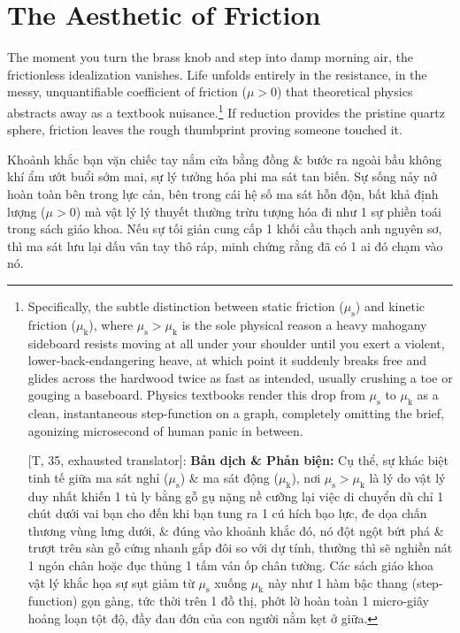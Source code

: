 \documentclass[11pt]{article}
\begin{document}
\section{The Aesthetic of Friction}
The moment you turn the brass knob and step into damp morning air, the frictionless idealization vanishes. Life unfolds entirely in the resistance, in the messy, unquantifiable coefficient of friction ($\mu > 0$) that theoretical physics abstracts away as a textbook nuisance.\footnote{Specifically, the subtle distinction between static friction ($\mu_{\mathrm{s}}$) and kinetic friction ($\mu_{\mathrm{k}}$), where $\mu_{\mathrm{s}} > \mu_{\mathrm{k}}$ is the sole physical reason a heavy mahogany sideboard resists moving at all under your shoulder until you exert a violent, lower-back-endangering heave, at which point it suddenly breaks free and glides across the hardwood twice as fast as intended, usually crushing a toe or gouging a baseboard. Physics textbooks render this drop from $\mu_{\mathrm{s}}$ to $\mu_{\mathrm{k}}$ as a clean, instantaneous step-function on a graph, completely omitting the brief, agonizing microsecond of human panic in between.
	
	\textsf{[T, 35, exhausted translator]:} \textbf{Bản dịch \& Phản biện:} Cụ thể, sự khác biệt tinh tế giữa ma sát nghỉ ($\mu_{\mathrm{s}}$) \& ma sát động ($\mu_{\mathrm{k}}$), nơi $\mu_{\mathrm{s}} > \mu_{\mathrm{k}}$ là lý do vật lý duy nhất khiến 1 tủ ly bằng gỗ gụ nặng nề cưỡng lại việc di chuyển dù chỉ 1 chút dưới vai bạn cho đến khi bạn tung ra 1 cú hích bạo lực, đe dọa chấn thương vùng lưng dưới, \& đúng vào khoảnh khắc đó, nó đột ngột bứt phá \& trượt trên sàn gỗ cứng nhanh gấp đôi so với dự tính, thường thì sẽ nghiền nát 1 ngón chân hoặc đục thủng 1 tấm ván ốp chân tường. Các sách giáo khoa vật lý khắc họa sự sụt giảm từ $\mu_{\mathrm{s}}$ xuống $\mu_{\mathrm{k}}$ này như 1 hàm bậc thang (step-function) gọn gàng, tức thời trên 1 đồ thị, phớt lờ hoàn toàn 1 micro-giây hoảng loạn tột độ, đầy đau đớn của con người nằm kẹt ở giữa.} If reduction provides the pristine quartz sphere, friction leaves the rough thumbprint proving someone touched it.

Khoảnh khắc bạn vặn chiếc tay nắm cửa bằng đồng \& bước ra ngoài bầu không khí ẩm ướt buổi sớm mai, sự lý tưởng hóa phi ma sát tan biến. Sự sống nảy nở hoàn toàn bên trong lực cản, bên trong cái hệ số ma sát hỗn độn, bất khả định lượng ($\mu > 0$) mà vật lý lý thuyết thường trừu tượng hóa đi như 1 sự phiền toái trong sách giáo khoa. Nếu sự tối giản cung cấp 1 khối cầu thạch anh nguyên sơ, thì ma sát lưu lại dấu vân tay thô ráp, minh chứng rằng đã có 1 ai đó chạm vào nó.
\end{document}
